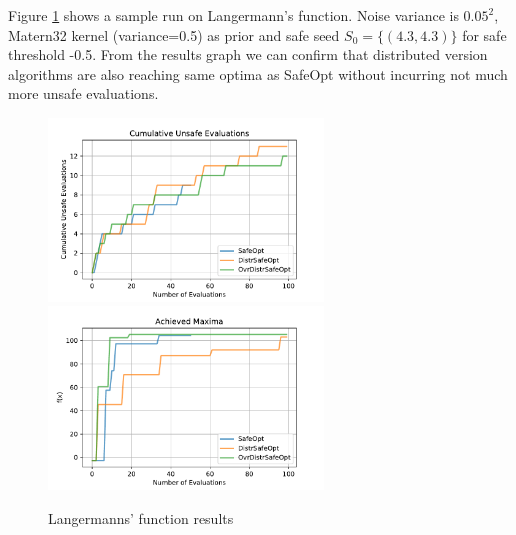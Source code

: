 Figure \ref{fig:langermann-result} shows a sample run on Langermann's function. Noise variance is $0.05^2$, Matern32 kernel (variance=0.5) as prior and safe seed $S_0=\{ (4.3,4.3)\}$ for safe threshold -0.5. From the results graph we can confirm that distributed version algorithms are also reaching same optima as SafeOpt without incurring not much more unsafe evaluations.
\begin{figure}[H]
	\centering
	\includegraphics[width=0.65\textwidth]{figures/results/bird-cum-unsafe.pdf}
	\includegraphics[width=0.65\textwidth]{figures/results/bird-maxima.pdf}
	\caption{Langermanns' function results}
	\label{fig:langermann-result}
\end{figure}

